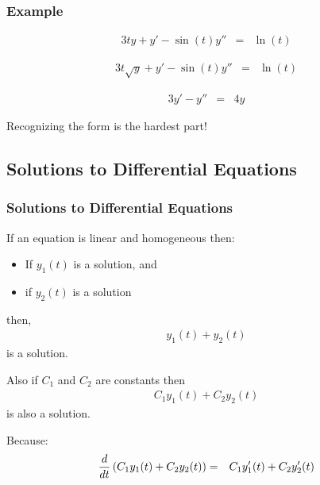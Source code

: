 \begin{frame}
  \frametitle{Example}

  \vspace*{-3em}
  \begin{eqnarray*}
    3t y + y' - \sin(t) y'' & = & \ln(t)
  \end{eqnarray*}
  \centerline{}

  \begin{eqnarray*}
    3t \sqrt{y} + y' - \sin(t) y'' & = & \ln(t)
  \end{eqnarray*}
  \centerline{}

  \begin{eqnarray*}
    3 y' -y'' & = & 4 y
  \end{eqnarray*}
  \centerline{}
  \centerline{}

  Recognizing the form is the hardest part!

\end{frame}

\subsection{Solutions to Differential Equations}

\begin{frame}
  \frametitle{Solutions to Differential Equations}

  If an equation is linear and homogeneous then:
  \begin{itemize}
  \item If $y_1(t)$ is a solution, and
  \item if $y_2(t)$ is a solution
  \end{itemize}

  then,
  \begin{eqnarray*}
    y_1(t) + y_2(t)
  \end{eqnarray*}
  is a solution.

  Also if $C_1$ and $C_2$ are constants then
  \begin{eqnarray*}
    C_1 y_1(t) + C_2 y_2(t)
  \end{eqnarray*}
  is also a solution.

  Because:
  \begin{eqnarray*}
    \frac{d}{dt} \left( C_1 y_1(t) + C_2 y_2(t) \right) & = &
    C_1 y_1'(t) + C_2 y_2'(t)
  \end{eqnarray*}


\end{frame}


